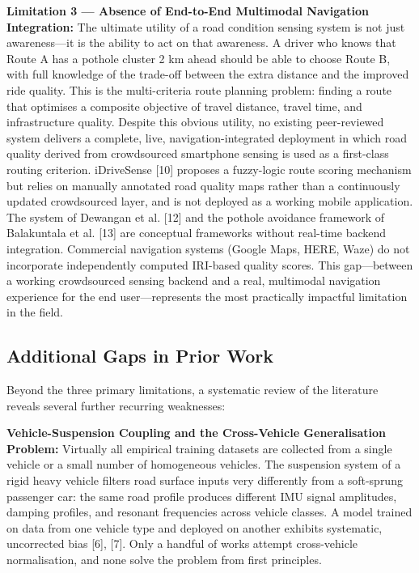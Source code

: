 \documentclass[conference]{IEEEtran}
\begin{document}
\textbf{Limitation 3 --- Absence of End-to-End Multimodal Navigation Integration:} The ultimate utility of a road condition sensing system is not just awareness---it is the ability to act on that awareness.
A driver who knows that Route A has a pothole cluster 2 km ahead should be able to choose Route B, with full knowledge of the trade-off between the extra distance and the improved ride quality.
This is the multi-criteria route planning problem: finding a route that optimises a composite objective of travel distance, travel time, and infrastructure quality.
Despite this obvious utility, no existing peer-reviewed system delivers a complete, live, navigation-integrated deployment in which road quality derived from crowdsourced smartphone sensing is used as a first-class routing criterion.
iDriveSense [10] proposes a fuzzy-logic route scoring mechanism but relies on manually annotated road quality maps rather than a continuously updated crowdsourced layer, and is not deployed as a working mobile application.
The system of Dewangan et al. [12] and the pothole avoidance framework of Balakuntala et al.
[13] are conceptual frameworks without real-time backend integration. Commercial navigation systems (Google Maps, HERE, Waze) do not incorporate independently computed IRI-based quality scores.
This gap---between a working crowdsourced sensing backend and a real, multimodal navigation experience for the end user---represents the most practically impactful limitation in the field.

\subsection{Additional Gaps in Prior Work}
Beyond the three primary limitations, a systematic review of the literature reveals several further recurring weaknesses:

\textbf{Vehicle-Suspension Coupling and the Cross-Vehicle Generalisation Problem:} Virtually all empirical training datasets are collected from a single vehicle or a small number of homogeneous vehicles.
The suspension system of a rigid heavy vehicle filters road surface inputs very differently from a soft-sprung passenger car: the same road profile produces different IMU signal amplitudes, damping profiles, and resonant frequencies across vehicle classes.
A model trained on data from one vehicle type and deployed on another exhibits systematic, uncorrected bias [6], [7].
Only a handful of works attempt cross-vehicle normalisation, and none solve the problem from first principles.
\end{document}
